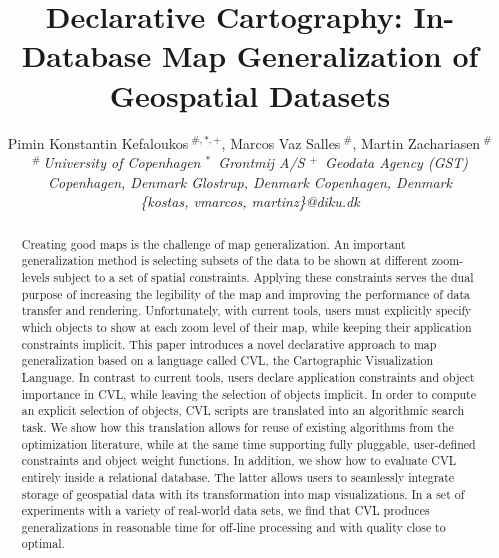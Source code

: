 \documentclass[10pt,conference,letterpaper]{IEEEtran}
\title{Declarative Cartography: In-Database Map Generalization of Geospatial Datasets}
\author{
{Pimin Konstantin Kefaloukos{\small $~^{\#,*,+}$}, Marcos Vaz Salles{\small $~^{\#}$}, Martin Zachariasen{\small $~^{\#}$} }%
\vspace{1.6mm}\\
\fontsize{10}{10}\selectfont\itshape
$^{\#}$\,University of Copenhagen \hspace{3ex} $^{*}$\ Grontmij A/S \hspace{6ex} $^{+}$\ Geodata Agency (GST)         \\
Copenhagen, Denmark \hspace{5ex} Glostrup, Denmark \hspace{6ex} Copenhagen, Denmark\\
\fontsize{9}{9}\selectfont\ttfamily\upshape
\{kostas, vmarcos, martinz\}@diku.dk
}
\begin{document}
\maketitle

\begin{abstract}
Creating good maps is the challenge of map generalization. An important generalization method is selecting subsets of the data to be shown at different zoom-levels subject to a set of spatial constraints. Applying these constraints serves the dual purpose of increasing the legibility of the map and improving the performance of data transfer and rendering.
Unfortunately, with current tools, users must explicitly specify which objects to show at each zoom level of their map, while keeping their application constraints implicit. This paper introduces a novel declarative approach to map generalization based on a language called CVL, the Cartographic Visualization Language. In contrast to current tools, users declare application constraints and object importance in CVL, while leaving the selection of objects implicit. In order to compute an explicit selection of objects, CVL scripts are translated into an algorithmic search task. We show how this translation allows for reuse of existing algorithms from the optimization literature, while at the same time supporting fully pluggable, user-defined constraints and object weight functions. In addition, we show how to evaluate CVL entirely inside a relational database. The latter allows users to seamlessly integrate storage of geospatial data with its transformation into map visualizations. In a set of experiments with a variety of real-world data sets, we find that CVL produces generalizations in reasonable time for off-line processing and with quality close to optimal. 
\end{abstract}



















%


\end{document}
